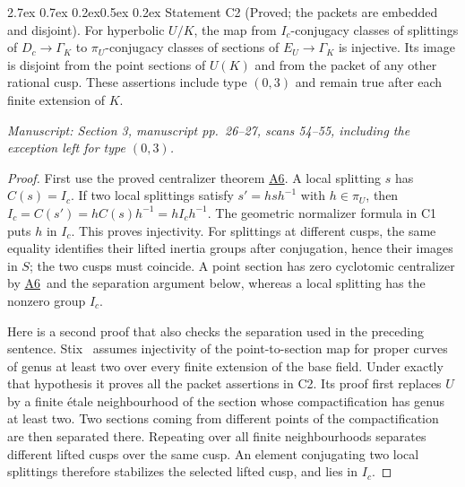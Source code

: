 \documentclass[11pt,a4paper]{article}
\makeatletter
\newcommand{\passage}[1]{\par\smallskip\noindent\textit{Manuscript: #1}\par\smallskip}
\newcommand{\resref}[1]{\hyperref[res:#1]{#1}}
\newcommand{\Rtwo}{\resref{A6}}
\renewcommand\paragraph{\@startsection{paragraph}{4}{\z@}%
  {2.7ex \@plus 0.7ex \@minus 0.2ex}{0.5ex \@plus 0.2ex}%
  {\normalfont\normalsize\bfseries}}
\makeatother
\begin{document}
\paragraph{Statement C2 (Proved; the packets are embedded and disjoint).}\label{res:C2}
For hyperbolic $U/K$, the map from $I_c$-conjugacy classes of splittings of $D_c\to\Gamma_K$ to $\pi_U$-conjugacy classes of sections of $E_U\to\Gamma_K$ is injective. Its image is disjoint from the point sections of $U(K)$ and from the packet of any other rational cusp. These assertions include type $(0,3)$ and remain true after each finite extension of $K$.
\passage{Section 3, manuscript pp.~26--27, scans 54--55, including the exception left for type $(0,3)$.}
\begin{proof}
First use the proved centralizer theorem \Rtwo. A local splitting $s$ has $C(s)=I_c$. If two local splittings satisfy $s'=hsh^{-1}$ with $h\in\pi_U$, then $I_c=C(s')=hC(s)h^{-1}=hI_ch^{-1}$. The geometric normalizer formula in C1 puts $h$ in $I_c$. This proves injectivity. For splittings at different cusps, the same equality identifies their lifted inertia groups after conjugation, hence their images in $S$; the two cusps must coincide. A point section has zero cyclotomic centralizer by \Rtwo\ and the separation argument below, whereas a local splitting has the nonzero group $I_c$.

Here is a second proof that also checks the separation used in the preceding sentence. Stix~\cite[Theorem 14(1)--(2)]{Stix2008} assumes injectivity of the point-to-section map for proper curves of genus at least two over every finite extension of the base field. Under exactly that hypothesis it proves all the packet assertions in C2. Its proof first replaces $U$ by a finite étale neighbourhood of the section whose compactification has genus at least two. Two sections coming from different points of the compactification are then separated there. Repeating over all finite neighbourhoods separates different lifted cusps over the same cusp. An element conjugating two local splittings therefore stabilizes the selected lifted cusp, and lies in $I_c$.


\end{proof}
\end{document}
